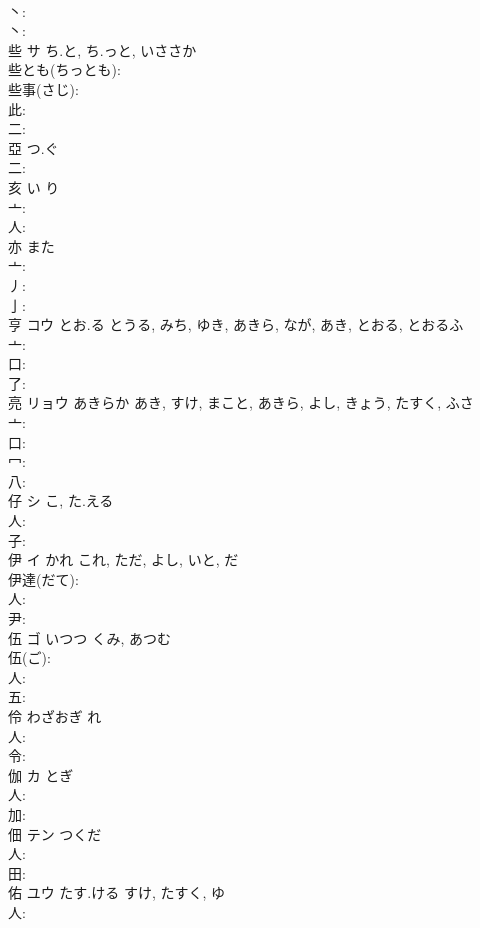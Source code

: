 \documentclass[8pt]{extreport}
\begin{document}
\begin{CJK}{UTF8}{min}
\\	丶: 
\\	丶: 
\\	些	サ	ち.と, ち.っと, いささか		
\\	些とも(ちっとも): 
\\	些事(さじ): 
\\	此: 
\\	二: 
\\	亞		つ.ぐ				
\\	二: 
\\	亥		い	り		
\\	亠: 
\\	人: 
\\	亦		また				
\\	亠: 
\\	丿: 
\\	亅: 
\\	亨	コウ	とお.る	とうる, みち, ゆき, あきら, なが, あき, とおる, とおるふ	
\\	亠: 
\\	口: 
\\	了: 
\\	亮	リョウ	あきらか	あき, すけ, まこと, あきら, よし, きょう, たすく, ふさ	
\\	亠: 
\\	口: 
\\	冖: 
\\	八: 
\\	仔	シ	こ, た.える		
\\	人: 
\\	子: 
\\	伊	イ	かれ	これ, ただ, よし, いと, だ	
\\	伊達(だて): 
\\	人: 
\\	尹: 
\\	伍	ゴ	いつつ	くみ, あつむ	
\\	伍(ご): 
\\	人: 
\\	五: 
\\	伶		わざおぎ	れ		
\\	人: 
\\	令: 
\\	伽	カ	とぎ		
\\	人: 
\\	加: 
\\	佃	テン	つくだ		
\\	人: 
\\	田: 
\\	佑	ユウ	たす.ける	すけ, たすく, ゆ	
\\	人: 

\end{CJK}
\end{document}
